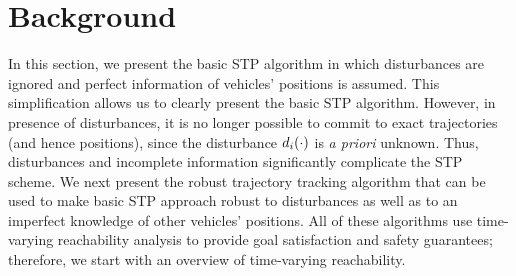 \section{Background \label{sec:background}}
In this section, we present the basic STP algorithm \cite{Chen15c} in which disturbances are ignored and perfect information of vehicles’ positions is assumed. This simplification allows us to clearly present the basic STP algorithm. However, in presence of disturbances, it is no longer possible to commit to exact trajectories (and hence positions), since the disturbance $d_i(\cdot)$ is \textit{a priori} unknown. Thus, disturbances and incomplete information significantly complicate the STP scheme. We next present the robust trajectory tracking algorithm \cite{Bansal2017} that can be used to make basic STP approach robust to disturbances as well as to an imperfect knowledge of other vehicles' positions. All of these algorithms use time-varying reachability analysis to provide goal satisfaction and safety guarantees; therefore, we start with an overview of time-varying reachability.
